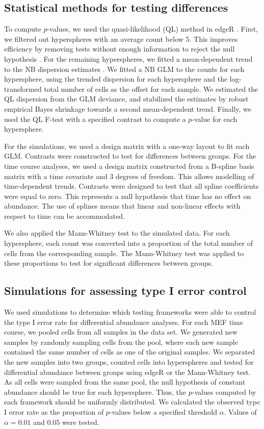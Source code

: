 \documentclass{article}
\begin{document}
\subsection{Statistical methods for testing differences}
To compute $p$-values, we used the quasi-likelihood (QL) method in edgeR \cite{lund2012detecting}.
First, we filtered out hyperspheres with an average count below 5.
This improves efficiency by removing tests without enough information to reject the null hypothesis \cite{bourgon2010independent}.
For the remaining hyperspheres, we fitted a mean-dependent trend to the NB dispersion estimates \cite{mccarthy2012differential}.
We fitted a NB GLM to the counts for each hypersphere, using the trended dispersion for each hypersphere and the log-transformed total number of cells as the offset for each sample.
We estimated the QL dispersion from the GLM deviance, and stabilized the estimates by robust empirical Bayes shrinkage \cite{phipson2016robust} towards a second mean-dependent trend.
Finally, we used the QL F-test with a specified contrast to compute a $p$-value for each hypersphere.

For the simulations, we used a design matrix with a one-way layout to fit each GLM.
Contrasts were constructed to test for differences between groups.
For the time course analyses, we used a design matrix constructed from a B-spline basis matrix with a time covariate and 3 degrees of freedom.
This allows modelling of time-dependent trends.
Contrasts were designed to test that all spline coefficients were equal to zero.
This represents a null hypothesis that time has no effect on abundance.
The use of splines means that linear and non-linear effects with respect to time can be accommodated.

We also applied the Mann-Whitney test to the simulated data.
For each hypersphere, each count was converted into a proportion of the total number of cells from the corresponding sample.
The Mann-Whitney test was applied to these proportions to test for significant differences between groups.

\subsection{Simulations for assessing type I error control}
We used simulations to determine which testing frameworks were able to control the type I error rate for differential abundance analyses.
For each MEF time course, we pooled cells from all samples in the data set.
We generated new samples by randomly sampling cells from the pool, where each new sample contained the same number of cells as one of the original samples.
We separated the new samples into two groups, counted cells into hyperspheres and tested for differential abundance between groups using edgeR or the Mann-Whitney test.
As all cells were sampled from the same pool, the null hypothesis of constant abundance should be true for each hypersphere.
Thus, the $p$-values computed by each framework should be uniformly distributed.
We calculated the observed type I error rate as the proportion of $p$-values below a specified threshold $\alpha$.
Values of $\alpha=0.01$ and 0.05 were tested.
\end{document}
